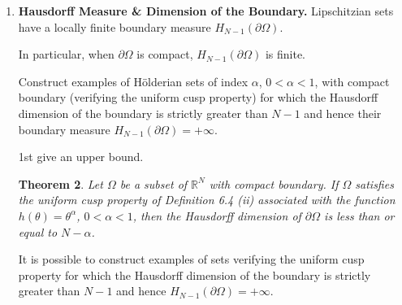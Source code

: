 \documentclass{book}
\numberwithin{equation}{section}
\newtheorem{theorem}{Theorem}[section]
\newtheorem{remark}{Remark}[section]
\begin{document}
\begin{enumerate}
\begin{enumerate}
        \begin{remark}
            In some applications, it might be interesting to relax the uniform cusp property by permitting the axis of the cuspidal region to bend: this makes the region look like a horn, and the corresponding property becomes a \emph{horn condition} or \emph{property}.
            
            Horn-shaped domains have been studied in several contexts in the literature.
            
            In particular conditions on domains have been introduced in the context of extension operators and embedding theorems: the domains of F. John [1]; the $(\varepsilon,\delta)$-domains of P. W. John [1]; and the domains satisfying a \emph{flexible horn condition} (which is a broader notion than the previous two) of O. V. Besov [1, 2].
        \end{remark}
        
        \begin{theorem}
            Let $\Omega$ be a subset of $\mathbb{R}^N$ s.t.  $\partial\Omega\ne\emptyset$ and let $0 < l < 1$. $\Omega$ is equi-Hölderian of index $l$ if and only if $\Omega$ has the uniform cusp property of index $l$.
        \end{theorem}
    \end{enumerate}
    \item \textbf{Hausdorff Measure \& Dimension of the Boundary.} Lipschitzian sets have a locally finite boundary measure $H_{N - 1}(\partial\Omega)$.
    
    In particular, when $\partial\Omega$ is compact, $H_{N - 1}(\partial\Omega)$ is finite.
    
    Construct examples of Hölderian sets of index $\alpha$, $0 < \alpha < 1$, with compact boundary (verifying the uniform cusp property) for which the Hausdorff dimension of the boundary is strictly greater than $N - 1$ and hence their boundary measure $H_{N - 1}(\partial\Omega) = +\infty$.
    
    1st give an upper bound.
    
    \begin{theorem}
        Let $\Omega$ be a subset of $\mathbb{R}^N$ with compact boundary. If $\Omega$ satisfies the uniform cusp property of Definition 6.4 (ii) associated with the function $h(\theta) = \theta^\alpha$, $0 < \alpha < 1$, then the Hausdorff dimension of $\partial\Omega$ is less than or equal to $N - \alpha$.
    \end{theorem}
    It is possible to construct examples of sets verifying the uniform cusp property for which the Hausdorff dimension of the boundary is strictly greater than $N - 1$ and hence $H_{N - 1}(\partial\Omega) = +\infty$.
    

\end{enumerate}
\end{document}
